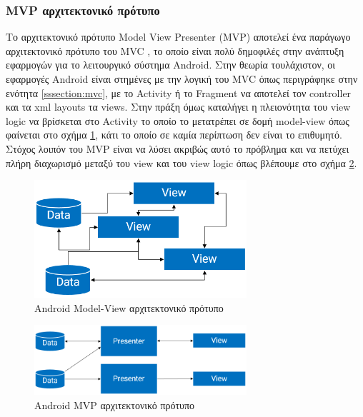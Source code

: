 	\subsubsection{MVP αρχιτεκτονικό πρότυπο}\label{sssect:MVP_architecture}
	Το αρχιτεκτονικό πρότυπο Model View Presenter (MVP) αποτελεί ένα παράγωγο αρχιτεκτονικό πρότυπο του MVC \cite{mvpPotel}, το οποίο είναι πολύ δημοφιλές στην ανάπτυξη εφαρμογών για το λειτουργικό σύστημα Android. Στην θεωρία τουλάχιστον, οι εφαρμογές Android είναι στημένες με την λογική του MVC \cite{androidArchAnalysis} όπως περιγράφηκε στην ενότητα \ref{sssection:mvc}, με το Activity ή το Fragment να αποτελεί τον controller και τα xml layouts τα views. Στην πράξη όμως καταλήγει η πλειονότητα του view logic να βρίσκεται στο Activity το οποίο το μετατρέπει σε δομή model-view όπως φαίνεται στο σχήμα \ref{fig:model_view}, κάτι το οποίο σε καμία περίπτωση δεν είναι το επιθυμητό. Στόχος λοιπόν του MVP είναι να λύσει ακριβώς αυτό το πρόβλημα και να πετύχει πλήρη διαχωρισμό μεταξύ του view και του view logic όπως βλέπουμε στο σχήμα \ref{fig:mvp_pattern}.
		
	 \begin{figure}[h]
	    \centering
	    \includegraphics[width=0.7\textwidth]{model_view.png}
	    \caption{Android Model-View αρχιτεκτονικό πρότυπο}
	    \label{fig:model_view}
	\end{figure}
	
	\begin{figure}[h]
	    \centering
	    \includegraphics[width=0.7\textwidth]{mvp_pattern.png}
	    \caption{Android MVP αρχιτεκτονικό πρότυπο}
	    \label{fig:mvp_pattern}
	\end{figure}
	
